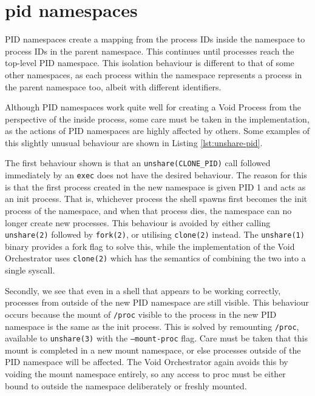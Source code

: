 \documentclass[a4paper,12pt,twoside,openright]{report}
\begin{document}
\section{pid namespaces}
\label{sec:voiding-pid}

PID namespaces create a mapping from the process IDs inside the namespace to process IDs in the parent namespace. This continues until processes reach the top-level PID namespace. This isolation behaviour is different to that of some other namespaces, as each process within the namespace represents a process in the parent namespace too, albeit with different identifiers.

Although PID namespaces work quite well for creating a Void Process from the perspective of the inside process, some care must be taken in the implementation, as the actions of PID namespaces are highly affected by others. Some examples of this slightly unusual behaviour are shown in Listing \ref{lst:unshare-pid}.

The first behaviour shown is that an \texttt{unshare(CLONE\_PID)} call followed immediately by an \texttt{exec} does not have the desired behaviour. The reason for this is that the first process created in the new namespace is given PID 1 and acts as an init process. That is, whichever process the shell spawns first becomes the init process of the namespace, and when that process dies, the namespace can no longer create new processes. This behaviour is avoided by either calling \texttt{unshare(2)} followed by \texttt{fork(2)}, or utilising \texttt{clone(2)} instead. The \texttt{unshare(1)} binary provides a fork flag to solve this, while the implementation of the Void Orchestrator uses \texttt{clone(2)} which has the semantics of combining the two into a single syscall.

Secondly, we see that even in a shell that appears to be working correctly, processes from outside of the new PID namespace are still visible. This behaviour occurs because the mount of \texttt{/proc} visible to the process in the new PID namespace is the same as the init process. This is solved by remounting \texttt{/proc}, available to \texttt{unshare(3)} with the \texttt{---mount-proc} flag. Care must be taken that this mount is completed in a new mount namespace, or else processes outside of the PID namespace will be affected. The Void Orchestrator again avoids this by voiding the mount namespace entirely, so any access to proc must be either bound to outside the namespace deliberately or freshly mounted.
\end{document}
